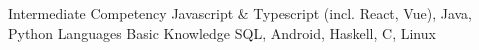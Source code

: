 \begin{cvhonors}
  \cvhonor
    {\quad Intermediate Competency}
    {Javascript \& Typescript (incl. React, Vue), Java, Python}
    {}
    {Languages}
  \cvhonor
    {\quad Basic Knowledge}
    {SQL, Android, Haskell, C, Linux}
    {}
    {}
\end{cvhonors}